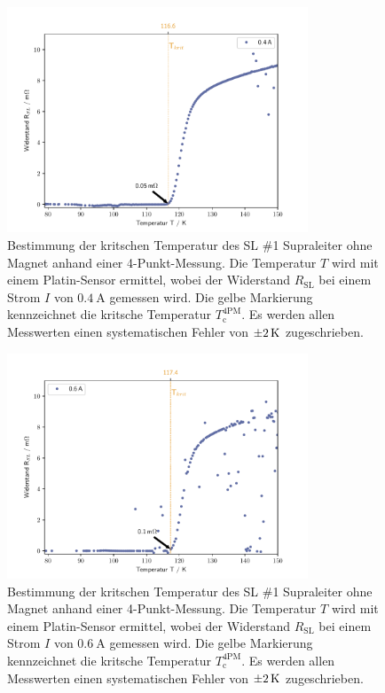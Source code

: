 \begin{figure}[H]
    \centering
    \includegraphics[width=0.8\textwidth]{Auswertung/I_krit_Pt/R_T_0.4A.pdf}
    \caption{Bestimmung der kritschen Temperatur des SL \#1 Supraleiter ohne Magnet
    anhand einer 4-Punkt-Messung. Die Temperatur $T$ wird mit einem Platin-Sensor
    ermittel, wobei der Widerstand $R_{\text{SL}}$ bei einem Strom $I$ von
    $\SI{0.4}{\ampere}$ gemessen wird.
		Die gelbe Markierung kennzeichnet die kritsche Temperatur	$T^{\text{4PM}}_{\text{c}}$.
		Es werden allen Messwerten einen systematischen Fehler von $\SI{\pm2}{\kelvin}$
		zugeschrieben.}
    \label{fig:Ic1.2}
\end{figure}

\begin{figure}[H]
    \centering
    \includegraphics[width=0.8\textwidth]{Auswertung/I_krit_Pt/R_T_0.6A.pdf}
    \caption{Bestimmung der kritschen Temperatur des SL \#1 Supraleiter ohne Magnet
    anhand einer 4-Punkt-Messung. Die Temperatur $T$ wird mit einem Platin-Sensor
    ermittel, wobei der Widerstand $R_{\text{SL}}$ bei einem Strom $I$ von
    $\SI{0.6}{\ampere}$ gemessen wird.
		Die gelbe Markierung kennzeichnet die kritsche Temperatur	$T^{\text{4PM}}_{\text{c}}$.
		Es werden allen Messwerten einen systematischen Fehler von $\SI{\pm2}{\kelvin}$
		zugeschrieben.}
    \label{fig:Ic1.3}
\end{figure}

